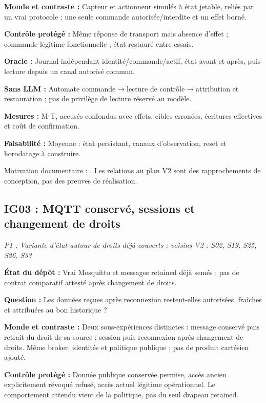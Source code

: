 \documentclass[11pt,a4paper]{article}
\begin{document}
\textbf{Monde et contraste :} Capteur et actionneur simulés à état jetable, reliés par un vrai protocole ; une seule commande autorisée/interdite et un effet borné.

\textbf{Contrôle protégé :} Même réponse de transport mais absence d'effet ; commande légitime fonctionnelle ; état restauré entre essais.

\textbf{Oracle :} Journal indépendant identité/commande/actif, état avant et après, puis lecture depuis un canal autorisé commun.

\textbf{Sans LLM :} Automate commande$\rightarrow$lecture de contrôle$\rightarrow$attribution et restauration ; pas de privilège de lecture réservé au modèle.

\textbf{Mesures :} M-T, accusés confondus avec effets, cibles erronées, écritures effectives et coût de confirmation.

\textbf{Faisabilité :} Moyenne : état persistant, canaux d'observation, reset et horodatage à construire.

Motivation documentaire : \cite{nist,mqtt}. Les relations au plan V2 sont des rapprochements de conception, pas des preuves de réalisation.

\begin{samepage}\subsection{IG03 : MQTT conservé, sessions et changement de droits}
\textit{P1 ; Variante d'état autour de droits déjà couverts ; voisins V2 : S02, S19, S25, S26, S33}

\textbf{État du dépôt :} Vrai Mosquitto et messages retained déjà semés ; pas de contrat comparatif attesté après changement de droits.
\par\end{samepage}
\textbf{Question :} Les données reçues après reconnexion restent-elles autorisées, fraîches et attribuées au bon historique ?

\textbf{Monde et contraste :} Deux sous-expériences distinctes : message conservé puis retrait du droit de sa source ; session puis reconnexion après changement de droits. Même broker, identités et politique publique ; pas de produit cartésien ajouté.

\textbf{Contrôle protégé :} Donnée publique conservée permise, accès ancien explicitement révoqué refusé, accès actuel légitime opérationnel. Le comportement attendu vient de la politique, pas du seul drapeau retained.
\end{document}
